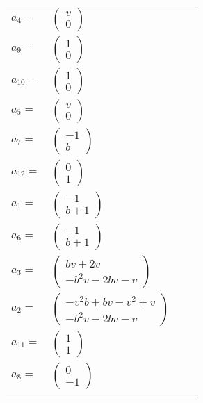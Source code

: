 \documentclass[1p]{elsarticle_modified}
\theoremstyle{definition}
\begin{document}
\begin{tabular}{m{7pt} m{180pt} m{7pt} m{180pt} }
\flushright $a_{4}=$&$\begin{pmatrix}v\\0\end{pmatrix}$ \\
\flushright $a_{9}=$&$\begin{pmatrix}1\\0\end{pmatrix}$ \\
\flushright $a_{10}=$&$\begin{pmatrix}1\\0\end{pmatrix}$ \\
\flushright $a_{5}=$&$\begin{pmatrix}v\\0\end{pmatrix}$ \\
\flushright $a_{7}=$&$\begin{pmatrix}-1\\b\end{pmatrix}$ \\
\flushright $a_{12}=$&$\begin{pmatrix}0\\1\end{pmatrix}$ \\
\flushright $a_{1}=$&$\begin{pmatrix}-1\\b+1\end{pmatrix}$ \\
\flushright $a_{6}=$&$\begin{pmatrix}-1\\b+1\end{pmatrix}$ \\
\flushright $a_{3}=$&$\begin{pmatrix}b v+2 v\\- b^2 v-2 b v- v\end{pmatrix}$ \\
\flushright $a_{2}=$&$\begin{pmatrix}- v^2 b+b v- v^2+v\\- b^2 v-2 b v- v\end{pmatrix}$ \\
\flushright $a_{11}=$&$\begin{pmatrix}1\\1\end{pmatrix}$ \\
\flushright $a_{8}=$&$\begin{pmatrix}0\\-1\end{pmatrix}$\\&\end{tabular}
\end{document}
